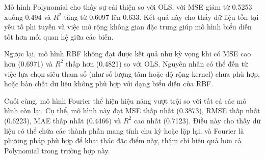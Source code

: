 Mô hình Polynomial cho thấy sự cải thiện so với OLS, với MSE giảm từ 0.5253
xuống 0.494 và $R^2$ tăng từ 0.6097 lên 0.633. Kết quả này cho thấy dữ liệu tồn
tại yếu tố phi tuyến và việc mở rộng không gian đặc trưng giúp mô hình biểu
diễn tốt hơn mối quan hệ giữa các biến.

Ngược lại, mô hình RBF không đạt được kết quả như kỳ vọng khi có MSE cao hơn
(0.6971) và $R^2$ thấp hơn (0.4821) so với OLS. Nguyên nhân có thể đến từ việc
lựa chọn siêu tham số (như số lượng tâm hoặc độ rộng kernel) chưa phù hợp, hoặc
bản chất dữ liệu không phù hợp với dạng biểu diễn của RBF.

Cuối cùng, mô hình Fourier thể hiện hiệu năng vượt trội so với tất cả các mô
hình còn lại. Cụ thể, mô hình này đạt MSE thấp nhất (0.3873), RMSE thấp nhất
(0.6223), MAE thấp nhất (0.4466) và $R^2$ cao nhất (0.7123). Điều này cho thấy
dữ liệu có thể chứa các thành phần mang tính chu kỳ hoặc lặp lại, và Fourier là
phương pháp phù hợp để khai thác đặc điểm này, thậm chí hiệu quả hơn cả
Polynomial trong trường hợp này.
